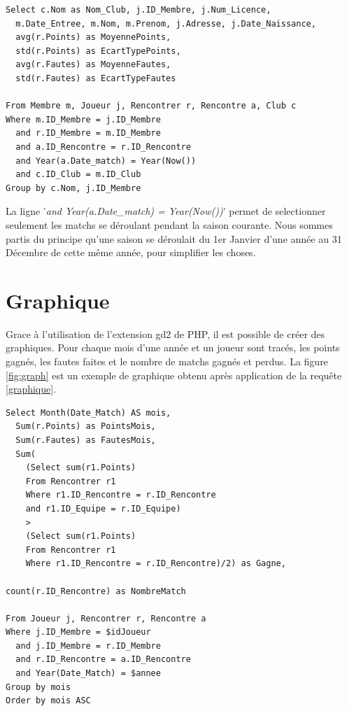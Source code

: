 \documentclass[a4paper»,8pt,french,fleqn]{report}
\begin{document}
\begin{lstlisting}
Select c.Nom as Nom_Club, j.ID_Membre, j.Num_Licence, 
  m.Date_Entree, m.Nom, m.Prenom, j.Adresse, j.Date_Naissance,
  avg(r.Points) as MoyennePoints,
  std(r.Points) as EcartTypePoints,
  avg(r.Fautes) as MoyenneFautes,
  std(r.Fautes) as EcartTypeFautes

From Membre m, Joueur j, Rencontrer r, Rencontre a, Club c
Where m.ID_Membre = j.ID_Membre
  and r.ID_Membre = m.ID_Membre
  and a.ID_Rencontre = r.ID_Rencontre
  and Year(a.Date_match) = Year(Now())
  and c.ID_Club = m.ID_Club
Group by c.Nom, j.ID_Membre
\end{lstlisting}

La ligne '\textit{and Year(a.Date\_match) = Year(Now())}' permet de selectionner seulement les matchs se déroulant pendant la saison courante. Nous sommes partis du principe qu'une saison se déroulait du 1er Janvier d'une année au 31 Décembre de cette même année, pour simplifier les choses.


\section{Graphique}
Grace à l'utilisation de l'extension gd2 de PHP, il est possible de créer des graphiques. Pour chaque mois d'une année et un joueur sont tracés, les points gagnés, les fautes faites et le nombre de matchs gagnés et perdus. La figure \ref{fig:graph} est un exemple de graphique obtenu après application de la requête \ref{graphique}.

\begin{lstlisting}
Select Month(Date_Match) AS mois,
  Sum(r.Points) as PointsMois,
  Sum(r.Fautes) as FautesMois,
  Sum(
    (Select sum(r1.Points)
    From Rencontrer r1
    Where r1.ID_Rencontre = r.ID_Rencontre
    and r1.ID_Equipe = r.ID_Equipe)
    >
    (Select sum(r1.Points)
    From Rencontrer r1
    Where r1.ID_Rencontre = r.ID_Rencontre)/2) as Gagne,
    
count(r.ID_Rencontre) as NombreMatch

From Joueur j, Rencontrer r, Rencontre a
Where j.ID_Membre = $idJoueur
  and j.ID_Membre = r.ID_Membre
  and r.ID_Rencontre = a.ID_Rencontre
  and Year(Date_Match) = $annee
Group by mois 
Order by mois ASC
\end{lstlisting}
\end{document}

